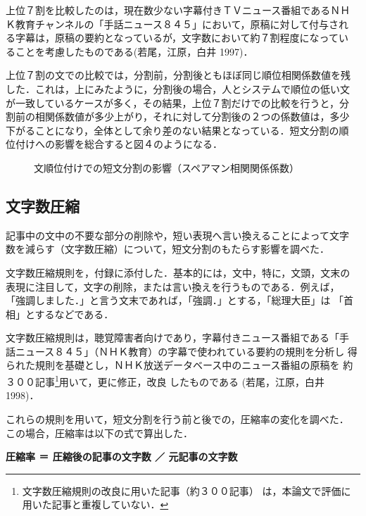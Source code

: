 \vspace{-3mm}
上位７割を比較したのは，現在数少ない字幕付きＴＶニュース番組であるＮＨ
Ｋ教育チャンネルの「手話ニュース８４５」において，原稿に対して付与され
る字幕は，原稿の要約となっているが，文字数において約７割程度になってい
ることを考慮したものである(若尾，江原，白井 1997)．

上位７割の文での比較では，分割前，分割後ともほぼ同じ順位相関係数値を残
した．これは，上にみたように，分割後の場合，人とシステムで順位の低い文
が一致しているケースが多く，その結果，上位７割だけでの比較を行うと，分
割前の相関係数値が多少上がり，それに対して分割後の２つの係数値は，多少
下がることになり，全体として余り差のない結果となっている．短文分割の順
位付けへの影響を総合すると図４のようになる．


\vspace{-3mm}
\begin{figure}[h]
\begin{center}
\mbox{}
\end{center}
\caption{文順位付けでの短文分割の影響（スペアマン相関関係係数）}
\end{figure}

\vspace{-8mm}
\subsection{文字数圧縮}
記事中の文中の不要な部分の削除や，短い表現へ言い換えることによって文字
数を減らす（文字数圧縮）について，短文分割のもたらす影響を調べた．

文字数圧縮規則を，付録に添付した．基本的には，文中，特に，文頭，文末の
表現に注目して，文字の削除，または言い換えを行うものである．例えば，
「強調しました．」と言う文末であれば，「強調．」とする，「総理大臣」は
「首相」とするなどである．

文字数圧縮規則は，聴覚障害者向けであり，字幕付きニュース番組である「手
話ニュース８４５」（ＮＨＫ教育）の字幕で使われている要約の規則を分析し
得られた規則を基礎とし，ＮＨＫ放送データベース中のニュース番組の原稿を
約３００記事\footnote{文字数圧縮規則の改良に用いた記事（約３００記事）
は，本論文で評価に用いた記事と重複していない．}用いて，更に修正，改良
したものである (若尾，江原，白井 1998)．

これらの規則を用いて，短文分割を行う前と後での，圧縮率の変化を調べた．
この場合，圧縮率は以下の式で算出した．

\vspace{3mm}
{\bf 圧縮率 ＝ 圧縮後の記事の文字数 ／ 元記事の文字数}
\vspace{3mm}

